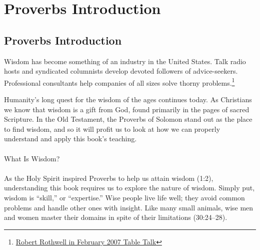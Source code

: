 \chapter{Proverbs Introduction}

\section{Proverbs Introduction}
Wisdom has become something of an industry in the United States. Talk radio hosts and syndicated columnists develop devoted followers of advice-seekers. Professional consultants help companies of all sizes solve thorny problems.\footnote{\href{https://tabletalkmagazine.com/article/2007/02/proverbs/}{Robert Rothwell in February 2007 Table Talk}}

Humanity’s long quest for the wisdom of the ages continues today. As Christians we know that wisdom is a gift from God, found primarily in the pages of sacred Scripture. In the Old Testament, the Proverbs of Solomon stand out as the place to find wisdom, and so it will profit us to look at how we can properly understand and apply this book’s teaching.\\
\\
What Is Wisdom?\\
\\
As the Holy Spirit inspired Proverbs to help us attain wisdom (1:2), understanding this book requires us to explore the nature of wisdom. Simply put, wisdom is “skill,” or “expertise.” Wise people live life well; they avoid common problems and handle other ones with insight. Like many small animals, wise men and women master their domains in spite of their limitations (30:24–28).

